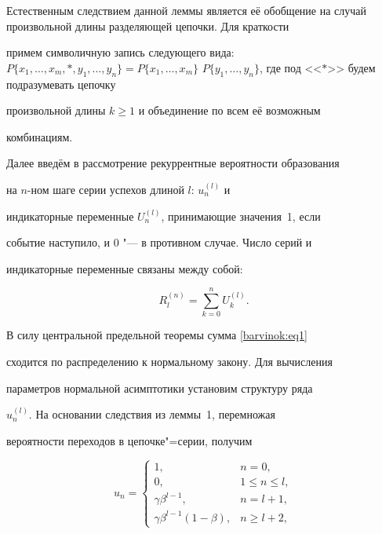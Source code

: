 Естественным следствием данной леммы является её обобщение на случай произвольной длины разделяющей цепочки. Для краткости

примем символичную запись следующего вида: $P \{x_1 ,\ldots ,x_m

,\ast ,y_1 ,\ldots ,y_n \}=P \{x_1 ,\ldots ,x_m \}$ $P \{ y_1

,\ldots,y_n \}$, где под <<$\ast $>> будем подразумевать цепочку

произвольной длины $k\ge 1$ и объединение по всем её возможным

комбинациям. 




Далее введём в рассмотрение рекуррентные вероятности образования

на $n$-ном шаге серии успехов длиной $l$: $u_n^{(l)}$ и

индикаторные переменные $U_n^{(l)}$, принимающие значения~1, если

событие наступило, и 0 "--- в противном случае. Число серий и

индикаторные переменные связаны между собой:

\begin{equation}

\label{barvinok:eq1} R_l^{( n)} =\sum\limits_{k=0}^n U_k^{(l)}.

\end{equation}



В силу центральной предельной теоремы сумма \eqref{barvinok:eq1}

сходится по распределению к нормальному закону. Для вычисления

параметров нормальной асимптотики установим структуру ряда

$u_n^{(l)}$. На основании следствия из леммы~1, перемножая

вероятности переходов в цепочке"=серии, получим

\begin{equation}

\label{barvinok:eq2} u_n =\begin{cases}

 1, & n=0, \\

 0, & 1\le n\le l, \\

 \gamma \beta^{l-1}, & n=l+1, \\

 \gamma \beta ^{l-1} (1-\beta), & n\ge l+2,

 \end{cases}

\end{equation}

